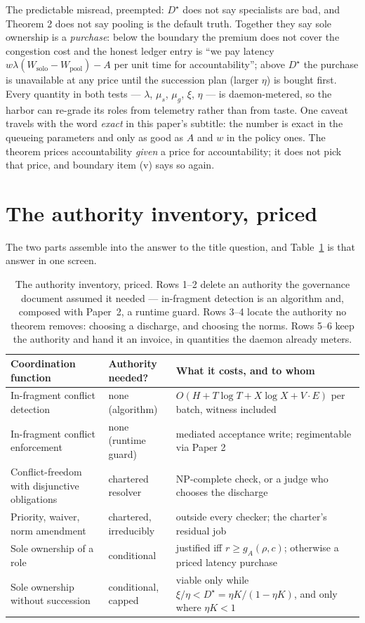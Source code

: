 \documentclass[11pt,a4paper]{article}
\begin{document}
The predictable misread, preempted: $D^\star$ does not say specialists are bad, and Theorem 2 does not say pooling is the
default truth. Together they say sole ownership is a \emph{purchase}: below the boundary the premium does not cover the
congestion cost and the honest ledger entry is ``we pay latency $w\lambda(W_{\mathrm{solo}}-W_{\mathrm{pool}})-A$ per unit time
for accountability''; above $D^\star$ the purchase is unavailable at any price until the succession plan (larger $\eta$) is
bought first. Every quantity in both tests --- $\lambda$, $\mu_s$, $\mu_g$, $\xi$, $\eta$ --- is daemon-metered, so the harbor
can re-grade its roles from telemetry rather than from taste. One caveat travels with the word \emph{exact} in this paper's
subtitle: the number is exact in the queueing parameters and only as good as $A$ and $w$ in the policy ones. The theorem prices
accountability \emph{given} a price for accountability; it does not pick that price, and boundary item (v) says so again.

\section{The authority inventory, priced}\label{sec:inventory}
The two parts assemble into the answer to the title question, and Table~\ref{tab:inventory} is that answer in one screen.

\begin{table}[t]\centering
\caption{The authority inventory, priced. Rows 1--2 delete an authority the governance document assumed it needed --- in-fragment
detection is an algorithm and, composed with Paper~2, a runtime guard. Rows 3--4 locate the authority no theorem removes:
choosing a discharge, and choosing the norms. Rows 5--6 keep the authority and hand it an invoice, in quantities the daemon
already meters.}
\label{tab:inventory}
\begin{tabular}{@{}p{}p{}p{}@{}}
\toprule
Coordination function & Authority needed? & What it costs, and to whom \\
\midrule
In-fragment conflict detection & none (algorithm) & $O(H+T\log T+X\log X+V\!\cdot\!E)$ per batch, witness included \\
In-fragment conflict enforcement & none (runtime guard) & mediated acceptance write; regimentable via Paper 2 \\
Conflict-freedom with disjunctive obligations & chartered resolver & NP-complete check, or a judge who chooses the discharge \\
Priority, waiver, norm amendment & chartered, irreducibly & outside every checker; the charter's residual job \\
Sole ownership of a role & conditional & justified iff $r \ge g_A(\rho,c)$; otherwise a priced latency purchase \\
Sole ownership without succession & conditional, capped & viable only while $\xi/\eta < D^\star = \eta K/(1-\eta K)$, and only
where $\eta K<1$ \\
\bottomrule
\end{tabular}
\end{table}
\end{document}
